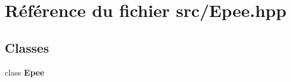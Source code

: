 \section{Référence du fichier src/\-Epee.hpp}
\label{_epee_8hpp}
\subsection*{Classes}
\begin{DoxyCompactItemize}
\item 
class {\bf Epee}
\end{DoxyCompactItemize}
